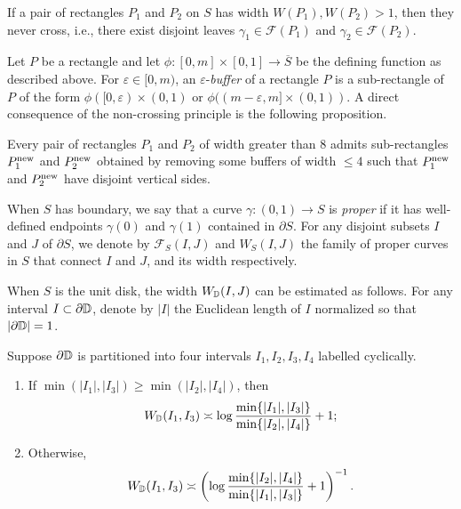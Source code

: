 \documentclass{amsart}
\begin{document}
\begin{proposition}
\label{prop:non-crossing-principle}
    If a pair of rectangles $P_1$ and $P_2$ on $S$ has width $W(P_1), W(P_2)> 1$, then they never cross, i.e., there exist disjoint leaves $\gamma_1 \in \mathcal{F}(P_1)$ and $\gamma_2 \in \mathcal{F}(P_2)$.
\end{proposition}

Let $P$ be a rectangle and let $\phi: [0,m] \times [0,1] \to \overline{S}$ be the defining function as described above.
For $\varepsilon \in [0,m)$, an $\varepsilon$-\emph{buffer} of a rectangle $P$ is a sub-rectangle of $P$ of the form $\phi( [0,\varepsilon)\times (0,1)$ or $\phi( (m-\varepsilon,m] \times (0,1))$. 
A direct consequence of the non-crossing principle is the following proposition.

\begin{proposition}[{\cite[Lemma 2.14]{KL09}}]
\label{prop:nice-buffers}
    Every pair of rectangles $P_1$ and $P_2$ of width greater than $8$ admits sub-rectangles $P_1^{\textnormal{new}}$ and $P_2^{\textnormal{new}}$ obtained by removing some buffers of width $\leq 4$ such that $P_1^{\textnormal{new}}$ and $P_2^{\textnormal{new}}$ have disjoint vertical sides.
\end{proposition}

When $S$ has boundary, we say that a curve $\gamma : (0,1) \to S$ is \emph{proper} if it has well-defined endpoints $\gamma(0)$ and $\gamma(1)$ contained in $\partial S$. For any disjoint subsets $I$ and $J$ of $\partial S$, we denote by $\mathcal{F}_S (I,J)$ and $W_S(I,J)$ the family of proper curves in $S$ that connect $I$ and $J$, and its width respectively. 

When $S$ is the unit disk, the width $W_{\mathbb{D}} (I,J)$ can be estimated as follows. For any interval $I \subset \partial \mathbb{D}$, denote by $|I|$ the Euclidean length of $I$ normalized so that $| \partial \mathbb{D}| = 1$.

\begin{proposition}
\label{prop:log-rule}
    Suppose $\partial \mathbb{D}$ is partitioned into four intervals $I_1, I_2, I_3, I_4$ labelled cyclically.
    \begin{enumerate}[label=\textnormal{(\arabic*)}]
        \item If $\min(|I_1|, |I_3|) \geq \min(|I_2|, |I_4|)$, then
        \[
        W_{\mathbb{D}}(I_1,I_3) \asymp \log \frac{\min \{|I_1|, |I_3|\}}{\min\{|I_2|, |I_4|\}} + 1;
        \]
        \item Otherwise,
        \[
        W_{\mathbb{D}}(I_1,I_3) \asymp \left( \log \frac{\min\{|I_2|, |I_4|\}}{\min\{|I_1|, |I_3|\}} + 1 \right)^{-1}.
        \]
    \end{enumerate}
\end{proposition}
\end{document}
